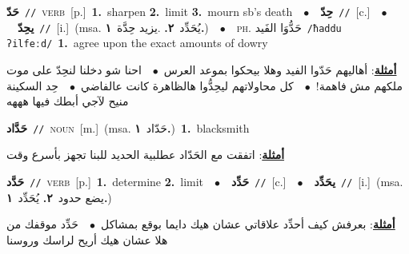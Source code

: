 \documentclass[10pt,a4paper,twoside]{article} %
\begin{document}
\begin{multicols}{2}
{\setlength\topsep{0pt}\textbf{\foreignlanguage{arabic}{حَدّ}}\ {\color{gray}\texttt{//}\color{black}}\ \textsc{verb}\ [p.]\ \textbf{1.}~sharpen  \textbf{2.}~limit  \textbf{3.}~mourn sb's death\ \ $\bullet$\ \ \setlength\topsep{0pt}\textbf{\foreignlanguage{arabic}{حِدّ}}\ {\color{gray}\texttt{//}\color{black}}\ [c.]\ \ $\bullet$\ \ \setlength\topsep{0pt}\textbf{\foreignlanguage{arabic}{يحِدّ}}\ {\color{gray}\texttt{//}\color{black}}\ [i.]\ \color{gray}(msa. \foreignlanguage{arabic}{يُحَدِّد}~\foreignlanguage{arabic}{\textbf{٢.}}  .\foreignlanguage{arabic}{يزيد حِدَّة}~\foreignlanguage{arabic}{\textbf{١.}})\color{black}\ \ $\bullet$\ \ \textsc{ph.} \color{gray} \foreignlanguage{arabic}{حَدُّوَا الفَيد}\color{black}\ {\color{gray}\texttt{/{\sffamily ħaddu ʔilfeːd}/}\color{black}}\ \textbf{1.}~agree upon the exact amounts of dowry\  \begin{flushright}\color{gray}\foreignlanguage{arabic}{\textbf{\underline{\foreignlanguage{arabic}{أمثلة}}}: أهاليهم حَدّوا الفيد وهلا بيحكوا بموعد العرس\ $\bullet$\ \  احنا شو دخلنا لنحِدّ على موت ملكهم مش فاهمة!\ $\bullet$\ \  كل محاولاتهم ليحِدُّوا هالظاهرة كانت عالفاضي\ $\bullet$\ \  حِد السكينة منيح لآجي أبطك فيها هههه}\end{flushright}\color{black}} \vspace{2mm}

{\setlength\topsep{0pt}\textbf{\foreignlanguage{arabic}{حَدَّاد}}\ {\color{gray}\texttt{//}\color{black}}\ \textsc{noun}\ [m.]\ \color{gray}(msa. \foreignlanguage{arabic}{حَدّاد}~\foreignlanguage{arabic}{\textbf{١.}})\color{black}\ \textbf{1.}~blacksmith\  \begin{flushright}\color{gray}\foreignlanguage{arabic}{\textbf{\underline{\foreignlanguage{arabic}{أمثلة}}}: اتفقت مع الحَدّاد عطلبية الحديد للبنا تجهز بأسرع وقت}\end{flushright}\color{black}} \vspace{2mm}

{\setlength\topsep{0pt}\textbf{\foreignlanguage{arabic}{حَدَّد}}\ {\color{gray}\texttt{//}\color{black}}\ \textsc{verb}\ [p.]\ \textbf{1.}~determine  \textbf{2.}~limit\ \ $\bullet$\ \ \setlength\topsep{0pt}\textbf{\foreignlanguage{arabic}{حَدِّد}}\ {\color{gray}\texttt{//}\color{black}}\ [c.]\ \ $\bullet$\ \ \setlength\topsep{0pt}\textbf{\foreignlanguage{arabic}{يحَدِّد}}\ {\color{gray}\texttt{//}\color{black}}\ [i.]\ \color{gray}(msa. \foreignlanguage{arabic}{يضع حدود}~\foreignlanguage{arabic}{\textbf{٢.}}  \foreignlanguage{arabic}{يُحَدِّد}~\foreignlanguage{arabic}{\textbf{١.}})\color{black}\  \begin{flushright}\color{gray}\foreignlanguage{arabic}{\textbf{\underline{\foreignlanguage{arabic}{أمثلة}}}: بعرفش كيف أحدِّد علاقاتي عشان هيك دايما بوقع بمشاكل\ $\bullet$\ \  حَدِّد موقفك من هلا عشان هيك أريح لراسك وروسنا}\end{flushright}\color{black}} \vspace{2mm}


\end{multicols}
\end{document}
